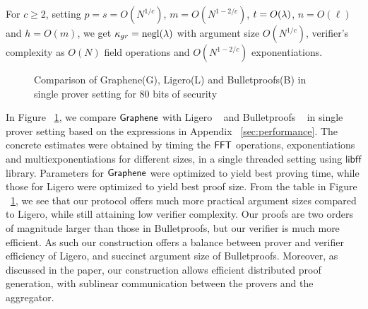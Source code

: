 For $c\geq 2$, setting $p=s=O(N^{1/c})$, $m=O(N^{1-2/c})$, $t=O(\lambda)$,
$n=O(\ell)$ and $h=O(m)$, we get $\kappa_{gr}=\mathrm{negl}(\lambda)$ with argument size
$O(N^{1/c})$, verifier's complexity as $O(N)$ field operations and
$O(N^{1-2/c})$ exponentiations. 

\begin{figure}[!]
\centering
{}
\caption{Comparison of Graphene(G), Ligero(L) and Bulletproofs(B) in single
prover setting for 80 bits of security}
\label{fig:standalonecompare}
\end{figure}


In Figure ~\ref{fig:standalonecompare}, we compare
$\textsf{Graphene}$ with Ligero ~\cite{ligero} and Bulletproofs ~\cite{bulletproofs} in
single prover setting based on the expressions in Appendix
~\ref{sec:performance}. The concrete estimates were obtained by timing the $\mathsf{FFT}$
operations, exponentiations and multiexponentiations for different sizes, in a
single threaded setting using $\mathsf{libff}$ library. Parameters for $\textsf{Graphene}$ were optimized to yield best
proving time, while those for Ligero were optimized to yield best proof size.
From the table in Figure ~\ref{fig:standalonecompare}, we see that our protocol offers much more practical argument
sizes compared to Ligero, while still attaining low verifier complexity. Our
proofs are two orders of magnitude larger than those in Bulletproofs, but our
verifier is much more efficient. As such our construction offers a balance
between prover and verifier efficiency of Ligero, and succinct argument size of
Bulletproofs. Moreover, as discussed in the paper, our construction allows
efficient distributed proof generation, with sublinear communication between the
provers and the aggregator. 
